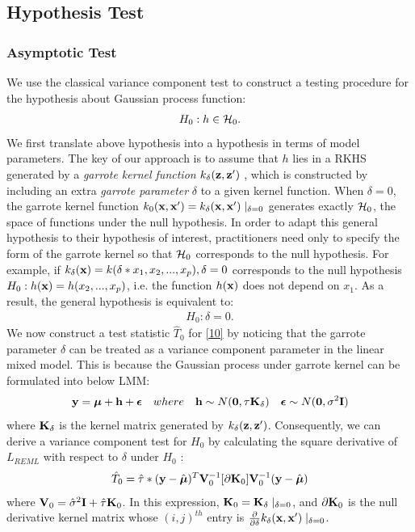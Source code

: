 \documentclass[11pt]{article}
\begin{document}
\subsection{{\textbf{Hypothesis Test}}}
\setcounter{equation}{0}
\renewcommand{\theequation}{2.2.\arabic{equation}}
\subsubsection{{Asymptotic Test}}
We use the classical variance component test \citep{lin_variance_1997} to construct a testing procedure for the hypothesis about Gaussian process function:
\begin{align}
H_0: h \in {\cal H}_0.
\end{align}
We first translate above hypothesis into a hypothesis in terms of model parameters. The key of our approach is to assume that $h$ lies in a RKHS generated by a \textsl{garrote kernel function} $k_{\delta}({\bf z}, {\bf z}')$ \citep{maity_powerful_2011}, which is constructed by including an extra \textsl{garrote parameter} $\delta$ to a given kernel function. When $\delta=0$, the garrote kernel function $k_0({\bf x}, {\bf x}')=k_{\delta}({\bf x}, {\bf x}')\mid _{\delta=0}$ generates exactly ${\cal H}_0$, the space of functions under the null hypothesis. In order to adapt this general hypothesis to their hypothesis of interest, practitioners need only to specify the form of the garrote kernel so that ${\cal H}_0$ corresponds to the null hypothesis. For example, if $k_{\delta}({\bf x})=k(\delta * x_1, x_2,..., x_p), \delta=0$ corresponds to the null hypothesis $H_0: h({\bf x})=h(x_2,...,x_p)$, i.e. the function $h({\bf x})$ does not depend on $x_1$. As a result, the general hypothesis is equivalent to:
\begin{align}
H_0: \delta=0. \label{10}
\end{align}
We now construct a test statistic $\hat{T}_0$ for \eqref{10} by noticing that the garrote parameter $\delta$ can be treated as a variance component parameter in the linear mixed model. This is because the Gaussian process under garrote kernel can be formulated into below LMM:
\begin{align}
{\bf y}=\boldsymbol{\mu}+{\bf h}+\boldsymbol{\epsilon} \quad where \quad {\bf h} \sim N(\mathbf{0}, \tau {\bf K}_\delta) \quad \boldsymbol{\epsilon} \sim N(\mathbf{0}, \sigma^2{\bf I})
\end{align}
where ${\bf K}_\delta$ is the kernel matrix generated by $k_{\delta}({\bf z}, {\bf z}')$. Consequently, we can derive a variance component test for $H_0$ by calculating the square derivative of $L_{REML}$ with respect to $\delta$ under $H_0$ \citep{lin_variance_1997}:
\begin{align}
\hat{T}_0=\hat{\tau}*({\bf y}-\hat{\boldsymbol{\mu}})^T{\bf V}_0^{-1}[\partial {\bf K}_0]{\bf V}_0^{-1}({\bf y}-\hat{\boldsymbol{\mu}}) \label{11}
\end{align}
where ${\bf V}_0=\hat{\sigma}^2{\bf I}+\hat{\tau}{\bf K}_0$. In this expression, ${\bf K}_0={\bf K}_\delta \mid_{\delta=0}$, and $\partial {\bf K}_0$ is the null derivative kernel matrix whose $(i, j)^{th}$ entry is $\frac{\partial }{\partial \delta}k_\delta({\bf x}, {\bf x}') \mid_{\delta=0}$.
\end{document}
